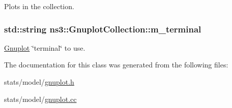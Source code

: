 Plots in the collection. 

\subsubsection[{\texorpdfstring{m\+\_\+terminal}{m_terminal}}]{\setlength{\rightskip}{0pt plus 5cm}std\+::string ns3\+::\+Gnuplot\+Collection\+::m\+\_\+terminal\hspace{0.3cm}{\ttfamily [private]}}\hypertarget{classns3_1_1GnuplotCollection_a99f22d3959512c75b8089649a55af086}{}\label{classns3_1_1GnuplotCollection_a99f22d3959512c75b8089649a55af086}


\hyperlink{classns3_1_1Gnuplot}{Gnuplot} \char`\"{}terminal\char`\"{} to use. 



The documentation for this class was generated from the following files\+:\begin{DoxyCompactItemize}
\item 
stats/model/\hyperlink{gnuplot_8h}{gnuplot.\+h}\item 
stats/model/\hyperlink{gnuplot_8cc}{gnuplot.\+cc}\end{DoxyCompactItemize}
